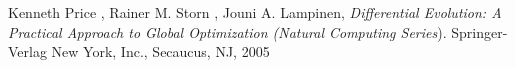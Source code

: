 \backmatter
\begin{thebibliography}{}
Kenneth Price , Rainer M. Storn , Jouni A. Lampinen, \textit{Differential Evolution: A Practical Approach to Global Optimization (Natural Computing Series}). Springer-Verlag New York, Inc., Secaucus, NJ, 2005

\end{thebibliography}